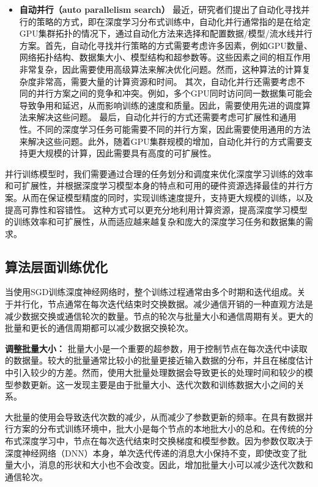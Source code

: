 \begin{itemize}
\item \textbf{自动并行（auto parallelism search）} 最近，研究者们提出了自动化寻找并行的策略的方式，即在深度学习分布式训练中，自动化并行通常指的是在给定GPU集群拓扑的情况下，通过自动化方法来选择和配置数据/模型/流水线并行方案。首先，自动化寻找并行策略的方式需要考虑许多因素，例如GPU数量、网络拓扑结构、数据集大小、模型结构和超参数等。这些因素之间的相互作用非常复杂，因此需要使用高级算法来解决优化问题。然而，这种算法的计算复杂度非常高，需要大量的计算资源和时间。
其次，自动化并行还需要考虑不同的并行方案之间的竞争和冲突。例如，多个GPU同时访问同一数据集可能会导致争用和延迟，从而影响训练的速度和质量。因此，需要使用先进的调度算法来解决这些问题。
最后，自动化并行的方式还需要考虑可扩展性和通用性。不同的深度学习任务可能需要不同的并行方案，因此需要使用通用的方法来解决这些问题。此外，随着GPU集群规模的增加，自动化并行的方式需要支持更大规模的计算，因此需要具有高度的可扩展性。
\end{itemize}

并行训练模型时，我们需要通过合理的任务划分和调度来优化深度学习训练的效率和可扩展性，并根据深度学习模型本身的特点和可用的硬件资源选择最佳的并行方案。从而在保证模型精度的同时，实现训练速度提升，支持更大规模的训练，以及提高可靠性和容错性。
% 
这种方式可以更充分地利用计算资源，提高深度学习模型的训练效率和可扩展性，从而适应越来越复杂和庞大的深度学习任务和数据集的需求。



\subsection{算法层面训练优化}
当使用SGD训练深度神经网络时，整个训练过程通常由多个时期和迭代组成。关于并行化，节点通常在每次迭代结束时交换数据。减少通信开销的一种直观方法是减少数据交换或通信轮次的数量。节点的轮次与批量大小和通信周期有关。更大的批量和更长的通信周期都可以减少数据交换轮次。

\noindent \textbf{调整批量大小：}
批量大小是一个重要的超参数，用于控制节点在每次迭代中读取的数据量。较大的批量通常比较小的批量更接近输入数据的分布，并且在梯度估计中引入较少的方差。然而，使用大批量处理数据会导致更长的处理时间和较少的模型参数更新。这一发现主要是由于批量大小、迭代次数和训练数据大小之间的关系。

大批量的使用会导致迭代次数的减少，从而减少了参数更新的频率。在具有数据并行方案的分布式训练环境中，批大小是每个节点的本地批大小的总和。在传统的分布式深度学习中，节点在每次迭代结束时交换梯度和模型参数。因为参数仅取决于深度神经网络（DNN）本身，单次迭代传递的消息大小保持不变，即使改变了批量大小，消息的形状和大小也不会改变。因此，增加批量大小可以减少迭代次数和通信轮次。

